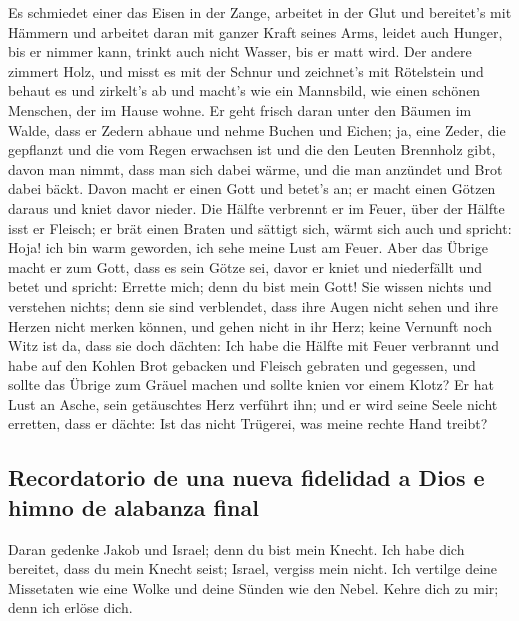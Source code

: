  Es schmiedet einer das Eisen in der Zange, arbeitet in
der Glut und bereitet's mit Hämmern und arbeitet daran mit ganzer Kraft
seines Arms, leidet auch Hunger, bis er nimmer kann, trinkt auch nicht
Wasser, bis er matt wird.  Der andere zimmert Holz, und
misst es mit der Schnur und zeichnet's mit Rötelstein und behaut es und
zirkelt's ab und macht's wie ein Mannsbild, wie einen schönen Menschen,
der im Hause wohne.  Er geht frisch daran unter den
Bäumen im Walde, dass er Zedern abhaue und nehme Buchen und Eichen; ja,
eine Zeder, die gepflanzt und die vom Regen erwachsen ist
 und die den Leuten Brennholz gibt, davon man nimmt, dass
man sich dabei wärme, und die man anzündet und Brot dabei bäckt. Davon
macht er einen Gott und betet's an; er macht einen Götzen daraus und
kniet davor nieder.  Die Hälfte verbrennt er im Feuer,
über der Hälfte isst er Fleisch; er brät einen Braten und sättigt sich,
wärmt sich auch und spricht: Hoja! ich bin warm geworden, ich sehe meine
Lust am Feuer.  Aber das Übrige macht er zum Gott, dass
es sein Götze sei, davor er kniet und niederfällt und betet und spricht:
Errette mich; denn du bist mein Gott!  Sie wissen nichts
und verstehen nichts; denn sie sind verblendet, dass ihre Augen nicht
sehen und ihre Herzen nicht merken können,  und gehen
nicht in ihr Herz; keine Vernunft noch Witz ist da, dass sie doch
dächten: Ich habe die Hälfte mit Feuer verbrannt und habe auf den Kohlen
Brot gebacken und Fleisch gebraten und gegessen, und sollte das Übrige
zum Gräuel machen und sollte knien vor einem Klotz?  Er
hat Lust an Asche, sein getäuschtes Herz verführt ihn; und er wird seine
Seele nicht erretten, dass er dächte: Ist das nicht Trügerei, was meine
rechte Hand treibt?

\hypertarget{recordatorio-de-una-nueva-fidelidad-a-dios-e-himno-de-alabanza-final}{%
\subsection{Recordatorio de una nueva fidelidad a Dios e himno de
alabanza
final}\label{recordatorio-de-una-nueva-fidelidad-a-dios-e-himno-de-alabanza-final}}

 Daran gedenke Jakob und Israel; denn du bist mein
Knecht. Ich habe dich bereitet, dass du mein Knecht seist; Israel,
vergiss mein nicht.  Ich vertilge deine Missetaten wie
eine Wolke und deine Sünden wie den Nebel. Kehre dich zu mir; denn ich
erlöse dich.

